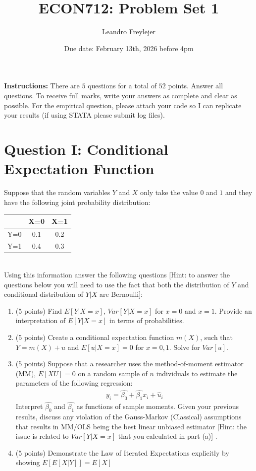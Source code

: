 \documentclass[letterpaper,12pt]{article}
\title{\vspace{-.5in} ECON712: Problem Set 1}
\author{Leandro Freylejer}
\date{Due date: February 13th, 2026 before 4pm }
\theoremstyle{dotlessS}
\begin{document}

\maketitle
\vspace{-.3in}
\textbf{Instructions:} There are $5$ questions for a total of $52$ points. Answer all questions. To receive full marks, write your answers as complete and clear as possible. For the empirical question, please attach your code so I can replicate your results (if using STATA please submit log files). 

\section*{Question I: Conditional Expectation Function}
Suppose that the random variables $Y$ and $X$ only take the value $0$ and $1$ and they have the following joint probability distribution: 
\begin{table}[h]
\centering
\begin{tabular}{|c| c |c|}
\hline
         & X=0 & X=1 \\
         \hline
Y=0  & 0.1 & 0.2 \\
Y=1  & 0.4 & 0.3 \\
\hline
\end{tabular}
\label{tab:three_by_three}
\end{table}
\\
Using this information answer the following questions [Hint: to answer the questions below you will need to use the fact that both the distribution of $Y$ and  conditional distribution of $Y|X$ are Bernoulli]:
\begin{enumerate}[label=(\alph*)]
\item (5 points) Find $E[Y|X=x]$, $Var[Y|X=x]$ for $x=0$ and $x=1$. Provide an interpretation of  $E[Y|X=x]$ in terms of probabilities.  
\item (5 points) Create a conditional expectation function $m(X)$, such that $Y=m(X)+u$ and $E[u|X=x]=0$ for $x=0,1$. Solve for $Var[u]$.
\item (5 points) Suppose that a researcher uses the method-of-moment estimator (MM), $E[XU]=0$ on a random sample of $n$ individuals to estimate the parameters of the following regression:
\begin{eqnarray*}
y_i=\hat{\beta_0}+\hat{\beta_1} x_i+\hat{u}_i
\end{eqnarray*}
Interpret  $\hat{\beta_0}$ and $\hat{\beta_1}$ as functions of sample moments. Given your previous results, discuss any violation of the Gauss-Markov (Classical) assumptions that results in MM/OLS being the best linear unbiased estimator [Hint: the issue is related to $Var[Y|X=x]$ that you calculated in part (a)] .       
\item (5 points) Demonstrate the Law of Iterated Expectations explicitly by showing $E[E[X|Y]]=E[X]$
\end{enumerate}
\newpage
\end{document}
